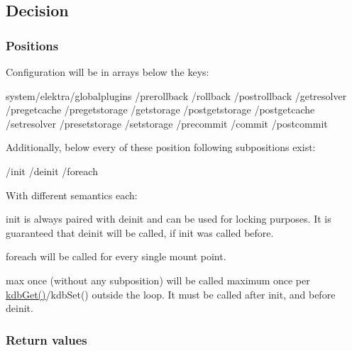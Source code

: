 \subsection*{Decision}

\subsubsection*{Positions}

Configuration will be in arrays below the keys\+: \begin{DoxyVerb}system/elektra/globalplugins
                             /prerollback
                             /rollback
                             /postrollback
                             /getresolver
                             /pregetcache
                             /pregetstorage
                             /getstorage
                             /postgetstorage
                             /postgetcache
                             /setresolver
                             /presetstorage
                             /setstorage
                             /precommit
                             /commit
                             /postcommit
\end{DoxyVerb}


Additionally, below every of these position following subpositions exist\+: \begin{DoxyVerb}                                        /init
                                        /deinit
                                        /foreach
\end{DoxyVerb}


With different semantics each\+:


\begin{DoxyItemize}
\item {\ttfamily init} is always paired with {\ttfamily deinit} and can be used for locking purposes. It is guaranteed that {\ttfamily deinit} will be called, if {\ttfamily init} was called before.
\item {\ttfamily foreach} will be called for every single mount point.
\item {\ttfamily max once} (without any subposition) will be called maximum once per {\ttfamily \hyperlink{group__kdb_ga28e385fd9cb7ccfe0b2f1ed2f62453a1}{kdb\+Get()}/kdb\+Set()} outside the loop. It must be called after {\ttfamily init}, and before {\ttfamily deinit}.
\end{DoxyItemize}

\subsubsection*{Return values}

